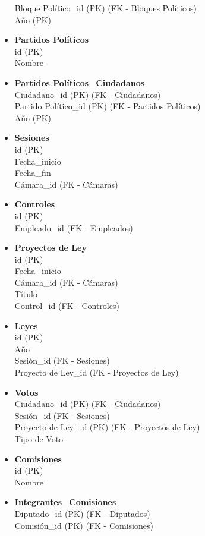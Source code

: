 \begin{itemize}
	Bloque Político\_id (PK) (FK - Bloques Políticos)\\
	Año (PK)
	\item \textbf{Partidos Políticos} \\
	id (PK) \\
	Nombre 
	\item \textbf{Partidos Políticos\_Ciudadanos} \\
	Ciudadano\_id (PK) (FK - Ciudadanos) \\
	Partido Político\_id (PK) (FK - Partidos Políticos)\\
	Año (PK)
	\item \textbf{Sesiones} \\
	id (PK) \\
	Fecha\_inicio \\
	Fecha\_fin \\
	Cámara\_id (FK - Cámaras)
	\item \textbf{Controles} \\
	id (PK) \\
	Empleado\_id (FK - Empleados)
	\item \textbf{Proyectos de Ley} \\
	id (PK) \\
	Fecha\_inicio \\
	Cámara\_id (FK - Cámaras) \\ 
	Título \\
	Control\_id (FK - Controles)
	\item \textbf{Leyes} \\
	id (PK) \\
	Año \\
	Sesión\_id (FK - Sesiones) \\
	Proyecto de Ley\_id (FK - Proyectos de Ley)
	\item \textbf{Votos} \\
	Ciudadano\_id (PK) (FK - Ciudadanos) \\
	Sesión\_id  (FK - Sesiones) \\
	Proyecto de Ley\_id (PK) (FK - Proyectos de Ley) \\
	Tipo de Voto
 	\item \textbf{Comisiones} \\
 	id (PK) \\
 	Nombre 
	\item \textbf{Integrantes\_Comisiones} \\
	Diputado\_id (PK) (FK - Diputados) \\
	Comisión\_id (PK) (FK - Comisiones) \\

\end{itemize}
